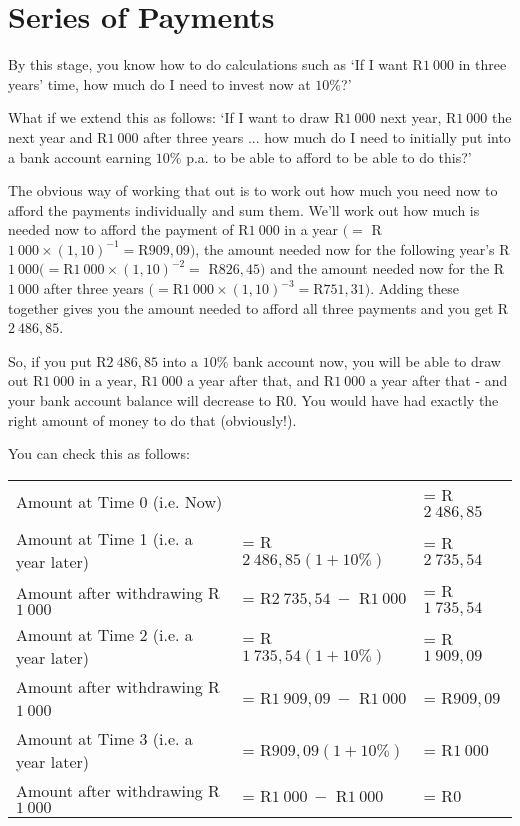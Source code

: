 \section{Series of Payments}

By this stage, you know how to do calculations such as `If I want R$1~000$ in three years' time, how much do I need to invest now at $10\%$?'

What if we extend this as follows: `If I want to draw R$1~000$ next year, R$1~000$ the next year and R$1~000$ after three years ... how much do I need to initially put into a bank account earning $10\%$ p.a. to be able to afford to be able to do this?'

The obvious way of working that out is to work out how much you need now to afford the payments individually and sum them. We'll work out how much is needed now to afford the payment of R$1~000$ in a year $(= $ {R}$1~000\times (1,10)^{-1} = ${R}$909,09)$, the amount needed now for the following year's R$1~000 (= ${R}$1~000\times (1,10)^{-2} = $ {R}$826,45)$ and the amount needed now for the R$1~000$ after three years $(= ${R}$1~000\times (1,10)^{-3} =${R}$751,31)$. Adding these together gives you the amount needed to afford all three payments and you get R$2~486,85$.

So, if you put R$2~486,85$ into a $10\%$ bank account now, you will be able to draw out R$1~000$ in a year, R$1~000$ a year after that, and R$1~000$ a year after that - and your bank account balance will decrease to R$0$. You would have had exactly the right amount of money to do that (obviously!).

You can check this as follows:

\begin{tabular}{lll}
Amount at Time 0 (i.e. Now) &&= R$2~486,85$\\
Amount at Time 1 (i.e. a year later) &= R$2~486,85(1+10\%)$ &= R$2~735,54$\\
Amount after withdrawing R$1~000$ &= R$2~735,54 ~-$ R$1~000$ &= R$1~735,54$\\
Amount at Time 2 (i.e. a year later) &= R$1~735,54(1+10\%)$ &= R$1~909,09$\\
Amount after withdrawing R$1~00$0 &= R$1~909,09 ~-$ R$1~000$ &= R$909,09$\\
Amount at Time 3 (i.e. a year later) &= R$909,09(1+10\%)$ &= R$1~000$\\
Amount after withdrawing R$1~000$ &= R$1~000 ~-$ R$1~000$ &= R$0$\\
\end{tabular}

